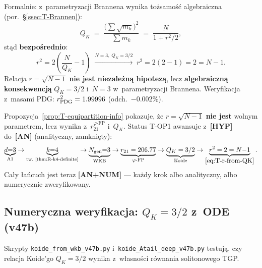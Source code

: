 \begin{proposition}
Formalnie: z~parametryzacji Brannena wynika to\.zsamo\'s\'c
algebraiczna (por.\ \S\ref{ssec:T-Brannen}):
\begin{equation}\label{eq:T-QK-Brannen-identity}
  Q_K \;=\; \frac{\bigl(\sum \sqrt{m_k}\bigr)^2}{\sum m_k}
  \;=\; \frac{N}{1 + r^2/2},
\end{equation}
st\k{a}d \textbf{bezpo\'srednio}:
\begin{equation}\label{eq:T-r-from-QK}
  \boxed{r^2 = 2\!\left(\frac{N}{Q_K} - 1\right)
  \;\xrightarrow{N=3,\; Q_K=3/2}\;
  r^2 = 2\!\left(2 - 1\right) = 2 = N - 1.}
\end{equation}
Relacja $r = \sqrt{N{-}1}$ \textbf{nie jest niezale\.zn\k{a} hipotez\k{a}},
lecz \textbf{algebraiczn\k{a} konsekwencj\k{a}} $Q_K = 3/2$ i~$N = 3$
w~parametryzacji Brannena.
Weryfikacja z~masami PDG: $r^2_{\rm PDG} = 1.99996$ (odch.\ $-0.002\%$).
\end{proposition}

\begin{remark}%
\label{rem:T-equipartition-upgrade}
Propozycja~\ref{prop:T-equipartition-info} pokazuje,
\.ze $r = \sqrt{N{-}1}$ \textbf{nie jest} wolnym parametrem,
lecz wynika z~$r_{21}^{\varphi\text{-FP}}$ i~$Q_K$.
Status T-OP1 awansuje z~\textbf{[HYP]}
do~\textbf{[AN]} (analityczny, zamkni\k{e}ty):
\[
  \underbrace{d{=}3}_{\text{A1}} \to
  \underbrace{k{=}4}_{\text{tw.~\ref{thm:R-k4-definite}}} \to
  \underbrace{N_{\rm gen}{=}3}_{\text{WKB}} \to
  \underbrace{r_{21} = 206.77}_{\varphi\text{-FP}} \to
  \underbrace{Q_K = 3/2}_{\text{Koide}} \to
  \underbrace{r^2 = 2 = N{-}1}_{\eqref{eq:T-r-from-QK}}.
\]
Ca\l{}y \l{}a\'ncuch jest teraz \textbf{[AN+NUM]} ---
ka\.zdy krok albo analityczny, albo numerycznie zweryfikowany.
\end{remark}


\subsection{Numeryczna weryfikacja: $Q_K = 3/2$ z~ODE (v47b)}%
\label{sec:T-koide-ode-v47b}

Skrypty \texttt{koide\_from\_wkb\_v47b.py} i~\texttt{koide\_Atail\_deep\_v47b.py}
testuj\k{a}, czy relacja Koide'go $Q_K = 3/2$ wynika z~w\l{}asno\'sci
r\'ownania solitonowego TGP.

